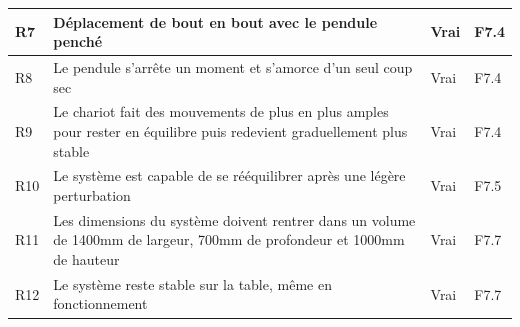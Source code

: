 \begin{table}[H]
{\begin{tabular}{|l|l|l|l|}
            R7                                                                                                                      & Déplacement de bout en bout avec le pendule penché                      & Vrai                     & F7.4              \\ \hline
            R8                                                                                                                      & Le pendule s'arrête un moment et s'amorce d'un seul coup sec            & Vrai                     & F7.4              \\ \hline
            R9                                                                                                                      &
            Le chariot fait des mouvements de plus en plus amples pour rester en équilibre puis redevient graduellement plus stable &
            Vrai                                                                                                                    &
            F7.4                                                                                                                                                                                                                                             \\ \hline
            R10                                                                                                                     & Le système est capable de se rééquilibrer après une légère perturbation & Vrai                     & F7.5              \\ \hline
            R11                                                                                                                     &
            Les dimensions du système doivent rentrer dans un volume de 1400mm de largeur, 700mm de profondeur et 1000mm de hauteur &
            Vrai                                                                                                                    &
            F7.7                                                                                                                                                                                                                                             \\ \hline
            R12                                                                                                                     & Le système reste stable sur la table, même en fonctionnement            & Vrai                     & F7.7              \\ \hline

\end{tabular}}
\end{table}
